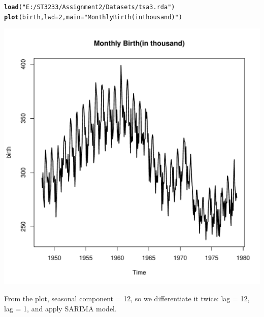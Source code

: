 \documentclass[10pt]{article}\usepackage[]{graphicx}\usepackage[]{color}
\makeatletter
\def\maxwidth{ %
  \ifdim\Gin@nat@width>\linewidth
    \linewidth
  \else
    \Gin@nat@width
  \fi
}
\newcommand{\hlnum}[1]{\textcolor[rgb]{0.686,0.059,0.569}{#1}}%
\newcommand{\hlstr}[1]{\textcolor[rgb]{0.192,0.494,0.8}{#1}}%
\newcommand{\hlstd}[1]{\textcolor[rgb]{0.345,0.345,0.345}{#1}}%
\newcommand{\hlkwc}[1]{\textcolor[rgb]{0.333,0.667,0.333}{#1}}%
\newcommand{\hlkwd}[1]{\textcolor[rgb]{0.737,0.353,0.396}{\textbf{#1}}}%
\newenvironment{kframe}{%
 \def\at@end@of@kframe{}%
 \ifinner\ifhmode%
  \def\at@end@of@kframe{\end{minipage}}%
  \begin{minipage}{\columnwidth}%
 \fi\fi%
 \def\FrameCommand##1{\hskip\@totalleftmargin \hskip-\fboxsep
 \colorbox{shadecolor}{##1}\hskip-\fboxsep
     \hskip-\linewidth \hskip-\@totalleftmargin \hskip\columnwidth}%
 \MakeFramed {\advance\hsize-\width
   \@totalleftmargin\z@ \linewidth\hsize
   \@setminipage}}%
 {\par\unskip\endMakeFramed%
 \at@end@of@kframe}
\newenvironment{knitrout}{}{} %
\makeatother
\begin{document}
\begin{knitrout}
\color{fgcolor}\begin{kframe}
\begin{alltt}
\hlkwd{load}\hlstd{(}\hlstr{"E:/ST3233/Assignment2/Datasets/tsa3.rda"}\hlstd{)}
\hlkwd{plot}\hlstd{(birth,}\hlkwc{lwd} \hlstd{=} \hlnum{2} \hlstd{,}\hlkwc{main} \hlstd{=} \hlstr{"Monthly Birth(in thousand)"}\hlstd{)}
\end{alltt}
\end{kframe}
\includegraphics[width=\maxwidth]{figure/unnamed-chunk-2-1} 

\end{knitrout}
From the plot, seasonal component = 12, so we differentiate it twice: lag = 12, lag = 1, and apply SARIMA model.
\end{document}
